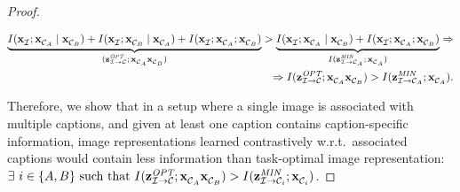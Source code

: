 \begin{proof}
\begin{itemize}
	\begin{align*}
	\underbrace{I( \img{}{} ; \capt{}{A} \mid \capt{}{B}) + I( \img{}{} ; \capt{}{B} \mid \capt{}{A}) + I( \img{}{} ; \capt{}{A} ;  \capt{}{B})}_{\textit{$(\zoptimal{}{\mathcal{C}} ; \capt{}{A}\capt{}{B} )$}}
	>
	\underbrace{ I(\img{}{} ; \capt{}{A} \mid \capt{}{B}) + I(\img{}{} ; \capt{}{A} ; \capt{}{B}) }_{\textit{$I(\zminsuff{A} ; \capt{}{A})$} } \Rightarrow \\
	\Rightarrow
	I( \zoptimal{}{\mathcal{C}} ; \capt{}{A}\capt{}{B} ) > I(\zminsuff{A} ; \capt{}{A}).
	\end{align*}
\end{itemize}

Therefore, we show that in a setup where a single image is associated with multiple captions, and given at least one caption contains caption-specific information, image representations learned contrastively w.r.t.\ associated captions would contain less information than task-optimal image representation: $\exists \ i \in \{A, B\}\ \text{such that}\ I(\zoptimal{}{\mathcal{C}} ; \capt{}{A}\capt{}{B}) > I(\zminsuff{i} ; \capt{}{i})$.
\end{proof}
